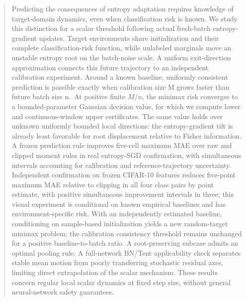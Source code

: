 \begin{abstract}
Predicting the consequences of entropy adaptation requires knowledge of target-domain dynamics, even when classification risk is known. We study this distinction for a scalar threshold following actual fresh-batch entropy-gradient updates. Target environments share initialization and their complete classification-risk function, while unlabeled marginals move an unstable entropy root on the batch-noise scale. A uniform exit-direction approximation connects this future trajectory to an independent calibration experiment. Around a known baseline, uniformly consistent prediction is possible exactly when calibration size M grows faster than future batch size n.~At positive finite \(M/n\), the minimax risk converges to a bounded-parameter Gaussian decision value, for which we compute lower and continuous-window upper certificates. The same value holds over unknown uniformly bounded local directions: the entropy-gradient tilt is already least favorable for root displacement relative to Fisher information. A frozen prediction rule improves five-cell maximum MAE over raw and clipped moment rules in real entropy-SGD confirmation, with simultaneous intervals accounting for calibration and reference-trajectory uncertainty. Independent confirmation on frozen CIFAR-10 features reduces five-point maximum MAE relative to clipping in all four class pairs by point estimate, with positive simultaneous improvement intervals in three; this visual experiment is conditional on known empirical baselines and has environment-specific risk. With an independently estimated baseline, conditioning on sample-based initialization yields a new random-target minimax problem; the calibration consistency threshold remains unchanged for a positive baseline-to-batch ratio. A root-preserving subcase admits an optimal pooling rule. A full-network BN/Tent applicability check separates stable mean motion from poorly transferring stochastic residual axes, limiting direct extrapolation of the scalar mechanism. These results concern regular local scalar dynamics at fixed step size, without general neural-network safety guarantees.
\end{abstract}
